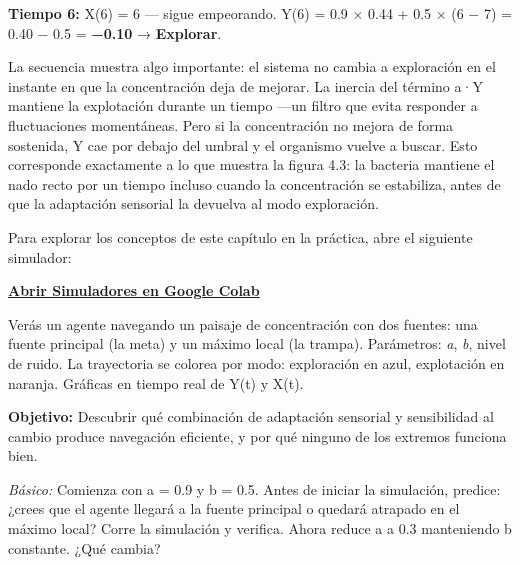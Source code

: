 \documentclass[
  letterpaper,
  DIV=11,
  numbers=noendperiod]{scrreprt}
\begin{document}
\textbf{Tiempo 6:} X(6) = 6 --- sigue empeorando. Y(6) = 0.9 × 0.44 +
0.5 × (6 − 7) = 0.40 − 0.5 = \textbf{−0.10} → \textbf{Explorar}.

La secuencia muestra algo importante: el sistema no cambia a exploración
en el instante en que la concentración deja de mejorar. La inercia del
término a·Y mantiene la explotación durante un tiempo ---un filtro que
evita responder a fluctuaciones momentáneas. Pero si la concentración no
mejora de forma sostenida, Y cae por debajo del umbral y el organismo
vuelve a buscar. Esto corresponde exactamente a lo que muestra la figura
4.3: la bacteria mantiene el nado recto por un tiempo incluso cuando la
concentración se estabiliza, antes de que la adaptación sensorial la
devuelva al modo exploración.

\begin{tcolorbox}[enhanced jigsaw, colbacktitle=quarto-callout-tip-color!10!white, opacitybacktitle=0.6, coltitle=black, colframe=quarto-callout-tip-color-frame, breakable, bottomtitle=1mm, rightrule=.15mm, left=2mm, toptitle=1mm, leftrule=.75mm, toprule=.15mm, arc=.35mm, colback=white, opacityback=0, title=\textcolor{quarto-callout-tip-color}{\faLightbulb}\hspace{0.5em}{🕹️ ¡Prueba el Simulador Interactivo!}, bottomrule=.15mm, titlerule=0mm]

Para explorar los conceptos de este capítulo en la práctica, abre el
siguiente simulador:

\href{https://colab.research.google.com/github/arbouria/Libro-ACA-2026/blob/main/Simuladores/ascenso_colina.ipynb}{\textbf{Abrir
Simuladores en Google Colab}}

\end{tcolorbox}

Verás un agente navegando un paisaje de concentración con dos fuentes:
una fuente principal (la meta) y un máximo local (la trampa).
Parámetros: \emph{a}, \emph{b}, nivel de ruido. La trayectoria se
colorea por modo: exploración en azul, explotación en naranja. Gráficas
en tiempo real de Y(t) y X(t).

\textbf{Objetivo:} Descubrir qué combinación de adaptación sensorial y
sensibilidad al cambio produce navegación eficiente, y por qué ninguno
de los extremos funciona bien.

\emph{Básico:} Comienza con a = 0.9 y b = 0.5. Antes de iniciar la
simulación, predice: ¿crees que el agente llegará a la fuente principal
o quedará atrapado en el máximo local? Corre la simulación y verifica.
Ahora reduce a a 0.3 manteniendo b constante. ¿Qué cambia?
\end{document}
